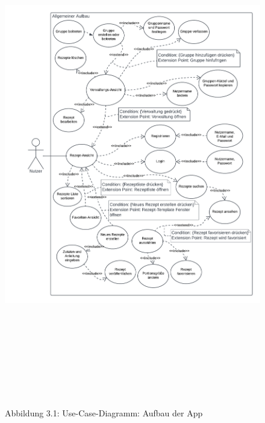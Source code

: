 \documentclass[parskip=full]{scrartcl}
\begin{document}
\begin{figure}[!htp]
    \centering
    \begin{adjustbox}{right=160mm}
        \includegraphics[height=220mm]{images/section3/Use-Case-Diagramm Aufbau App.png}
    \end{adjustbox}
    \caption*{Abbildung 3.1: Use-Case-Diagramm: Aufbau der App}
    \label{fig:A31}
\end{figure}
\newpage
\end{document}
